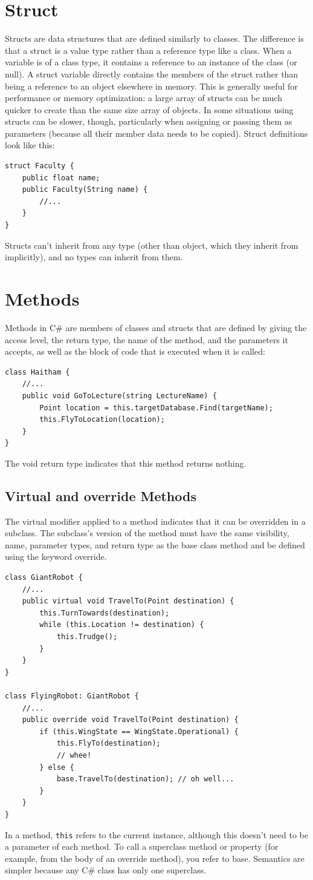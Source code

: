 \documentclass[12pt,a4paper,final,twoside,titlepage]{book}
\begin{document}
\section{Struct}
Structs are data structures that are defined similarly to classes. The difference is that a struct is a value type rather than a reference type like a class. When a variable is of a class type, it contains a reference to an instance of the class (or null). A struct variable directly contains the members of the struct rather than being a reference to an object elsewhere in memory. This is generally useful for performance or memory optimization: a large array of structs can be much quicker to create than the same size array of objects. In some situations using structs can be slower, though, particularly when assigning or passing them as parameters (because all their member data needs to be copied). 
Struct definitions look like this:
\begin{lstlisting}
struct Faculty { 
	public float name; 
	public Faculty(String name) {
		//...
	}
}
\end{lstlisting}
Structs can’t inherit from any type (other than object, which they inherit from
implicitly), and no types can inherit from them.
\section{Methods}
Methods in C\# are members of classes and structs that are defined by giving the access level, the return type, the name of the method, and the parameters it accepts, as well as the block of code that is executed when it is called:
\begin{lstlisting}
class Haitham { 
	//...
	public void GoToLecture(string LectureName) { 
		Point location = this.targetDatabase.Find(targetName); 
		this.FlyToLocation(location);
	}
}
\end{lstlisting}
The void return type indicates that this method returns nothing.
\subsection{Virtual and override Methods}
The virtual modifier applied to a method indicates that it can be overridden in a subclass. The subclass’s version of the method must have the same visibility, name, parameter types, and return type as the base class method and be defined using the keyword override.
\begin{lstlisting}
class GiantRobot { 
	//...
	public virtual void TravelTo(Point destination) { 
		this.TurnTowards(destination); 
		while (this.Location != destination) {
			this.Trudge();
		}
	}
}

class FlyingRobot: GiantRobot { 
	//...
	public override void TravelTo(Point destination) { 
		if (this.WingState == WingState.Operational) {
			this.FlyTo(destination); 
			// whee! 
		} else {
			base.TravelTo(destination); // oh well...
		}	
	}
}
\end{lstlisting}
In a method, \texttt{this} refers to the current instance, although this doesn’t need to be a parameter of each method. To call a superclass method or property (for example, from the body of an override method), you refer to base. Semantics are simpler because any C\# class has only one superclass.
\end{document}
